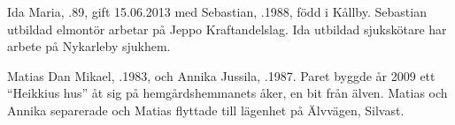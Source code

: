 


Ida Maria, .89, gift 15.06.2013 med Sebastian, .1988, född i Kållby. Sebastian utbildad elmontör arbetar på Jeppo Kraftandelslag. Ida utbildad sjukskötare har arbete på Nykarleby sjukhem.
\begin{jhchildren}
  \item {}
  \item {}
\end{jhchildren}


Matias Dan Mikael, .1983, och Annika Jussila, .1987. Paret byggde år 2009 ett ``Heikkius hus'' åt sig på hemgårdshemmanets åker, en bit från älven. Matias och Annika separerade och Matias flyttade till lägenhet på Älvvägen, Silvast.
